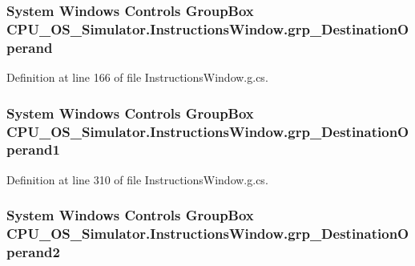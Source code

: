\subsubsection[{grp\+\_\+\+Destination\+Operand}]{\setlength{\rightskip}{0pt plus 5cm}System Windows Controls Group\+Box C\+P\+U\+\_\+\+O\+S\+\_\+\+Simulator.\+Instructions\+Window.\+grp\+\_\+\+Destination\+Operand\hspace{0.3cm}{\ttfamily [package]}}\label{class_c_p_u___o_s___simulator_1_1_instructions_window_a836175caed2a6d02d8635bb6cc3f6cae}


Definition at line 166 of file Instructions\+Window.\+g.\+cs.

\hypertarget{class_c_p_u___o_s___simulator_1_1_instructions_window_ab89f01ff39ce6f5ed461fcf5242be3a5}{}
\subsubsection[{grp\+\_\+\+Destination\+Operand1}]{\setlength{\rightskip}{0pt plus 5cm}System Windows Controls Group\+Box C\+P\+U\+\_\+\+O\+S\+\_\+\+Simulator.\+Instructions\+Window.\+grp\+\_\+\+Destination\+Operand1\hspace{0.3cm}{\ttfamily [package]}}\label{class_c_p_u___o_s___simulator_1_1_instructions_window_ab89f01ff39ce6f5ed461fcf5242be3a5}


Definition at line 310 of file Instructions\+Window.\+g.\+cs.

\hypertarget{class_c_p_u___o_s___simulator_1_1_instructions_window_adc32bbf0f47985507d606abb4862072f}{}
\subsubsection[{grp\+\_\+\+Destination\+Operand2}]{\setlength{\rightskip}{0pt plus 5cm}System Windows Controls Group\+Box C\+P\+U\+\_\+\+O\+S\+\_\+\+Simulator.\+Instructions\+Window.\+grp\+\_\+\+Destination\+Operand2\hspace{0.3cm}{\ttfamily [package]}}\label{class_c_p_u___o_s___simulator_1_1_instructions_window_adc32bbf0f47985507d606abb4862072f}


